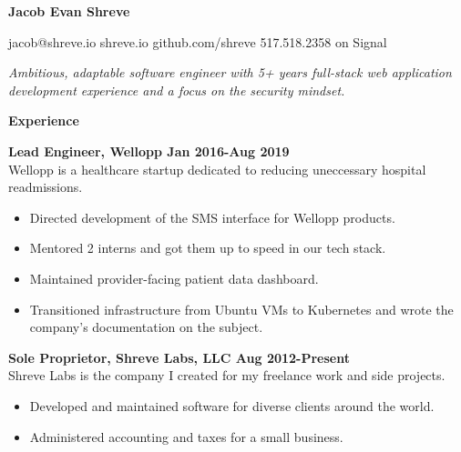 \documentclass[10pt,letter]{article}
\begin{document}
\hspace*{-1.1in}

\vspace*{-0.25in}
\textbf{\Huge Jacob Evan Shreve}

\vspace{0.25in}

{jacob@shreve.io \hfill shreve.io \hfill github.com/shreve \hfill 517.518.2358 on Signal}
\vspace{0.25in}

\textit{\large{
Ambitious, adaptable software engineer with 5+ years full-stack web application development experience
and a focus on the security mindset.
}}
\vspace{0.25in}

{\LARGE\textbf{Experience}}
\vspace{0.15in}

\textbf{Lead Engineer, Wellopp \hfill Jan 2016-Aug 2019}\\
Wellopp is a healthcare startup dedicated to reducing uneccessary hospital readmissions.
\begin{itemize}[leftmargin=1em]
  \setlength\itemsep{-0.3em}
  \item Directed development of the SMS interface for Wellopp products.
  \item Mentored 2 interns and got them up to speed in our tech stack.
  \item Maintained provider-facing patient data dashboard.
  \item Transitioned infrastructure from Ubuntu VMs to Kubernetes and wrote the company's documentation on the subject.
\end{itemize}
\vspace{0.15in}

\textbf{Sole Proprietor, Shreve Labs, LLC \hfill Aug 2012-Present}\\
Shreve Labs is the company I created for my freelance work and side projects.
\begin{itemize}[leftmargin=1em]
  \setlength\itemsep{-0.3em}
  \item Developed and maintained software for diverse clients around the world.
  \item Administered accounting and taxes for a small business.
\end{itemize}
\vspace{0.15in}
\end{document}
